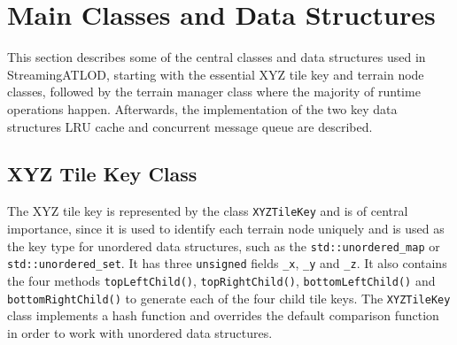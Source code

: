 \section{Main Classes and Data Structures}
This section describes some of the central classes and data structures used in StreamingATLOD,
starting with the essential XYZ tile key and terrain node classes, followed by the terrain manager class
where the majority of runtime operations happen. Afterwards, the implementation of the two key data structures 
LRU cache and concurrent message queue are described.

\subsection{XYZ Tile Key Class}
The XYZ tile key is represented 
by the class \texttt{XYZTileKey} and is of central importance,
since it is used to identify each terrain node uniquely
and is used as the key type for unordered data structures, such as the \texttt{std::unordered\_map}
or \texttt{std::unordered\_set}. It has three \texttt{unsigned} fields \texttt{\_x},
\texttt{\_y} and \texttt{\_z}. It also contains the four methods 
\texttt{topLeftChild()}, \texttt{topRightChild()},
\texttt{bottomLeftChild()} and \texttt{bottomRightChild()}
to generate each of the four child tile keys.
The \texttt{XYZTileKey} class 
implements a hash function and overrides the 
default comparison function in order to work with 
unordered data structures.


